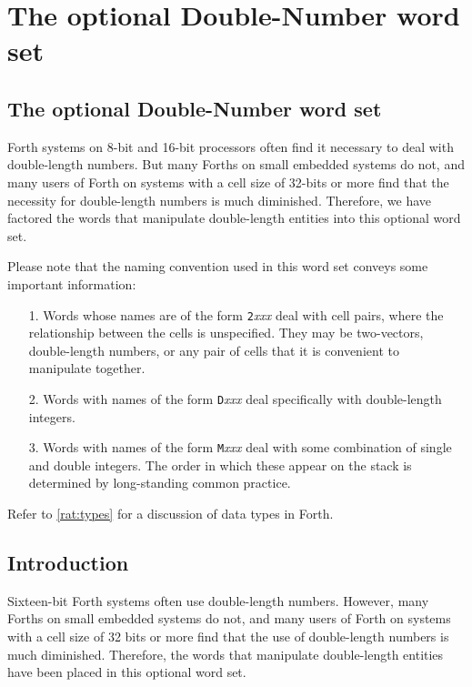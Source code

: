 \chapter{The optional Double-Number word set} %

\begin{info}
\section{The optional Double-Number word set}

Forth systems on 8-bit and 16-bit processors often find it necessary
to deal with double-length numbers. But many Forths on small embedded
systems do not, and many users of Forth on systems with a cell size of
32-bits or more find that the necessity for double-length numbers is
much diminished. Therefore, we have factored the words that manipulate
double-length entities into this optional word set.

Please note that the naming convention used in this word set conveys
some important information:

\begin{enumerate}
\item[1.]
	Words whose names are of the form \texttt{2}\emph{xxx} deal
	with cell pairs, where the relationship between the cells is
	unspecified. They may be two-vectors, double-length numbers, or
	any pair of cells that it is convenient to manipulate together.

\item[2.]
	Words with names of the form \texttt{D}\emph{xxx} deal
	specifically with double-length integers.

\item[3.]
	Words with names of the form \texttt{M}\emph{xxx} deal with
	some combination of single and double integers. The order in
	which these appear on the stack is determined by long-standing
	common practice.
\end{enumerate}

Refer to \ref{rat:types} for a discussion of data types in Forth.
\end{info}

\section{Introduction} %

Sixteen-bit Forth systems often use double-length numbers. However, many
Forths on small embedded systems do not, and many users of Forth on systems
with a cell size of 32 bits or more find that the use of double-length
numbers is much diminished. Therefore, the words that manipulate
double-length entities have been placed in this optional word set.

